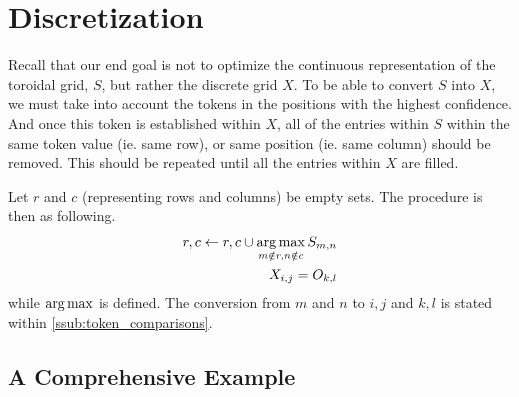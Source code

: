 \section{Discretization}%
\label{sec:discretization}
Recall that our end goal is not to optimize the continuous representation of the toroidal grid, $S$, but rather the discrete grid $X$. To be able to convert $S$ into $X$, we must take into account the tokens in the positions with the highest confidence. And once this token is established within $X$, all of the entries within $S$ within the same token value (ie. same row), or same position (ie. same column) should be removed. This should be repeated until all the entries within $X$ are filled.

Let $r$ and $c$ (representing rows and columns) be empty sets. The procedure is then as following.
\begin{align*}
    r,c\leftarrow r,c\cup \operatorname*{arg\,max}_{m\notin r,n\notin c}S_{m,n}\\
    X_{i,j}=O_{k,l}
\end{align*}
while $\operatorname*{arg\,max}$ is defined. The conversion from $m$ and $n$ to $i,j$ and $k,l$ is stated within \ref{ssub:token_comparisons}.

\subsection{A Comprehensive Example}%
\label{sub:a_comprehensive_example}


